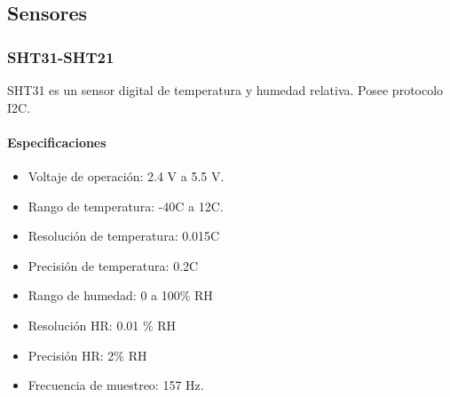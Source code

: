 
\subsection{Sensores}
	\subsubsection{SHT31-SHT21}
	SHT31 es un sensor digital de temperatura y humedad relativa. Posee protocolo I2C.
	\paragraph*{Especificaciones}

	\begin{minipage}[t]{.7\textwidth}
		\begin{itemize}
			\item   Voltaje de operación: 2.4 V a 5.5 V.
			\item	Rango de temperatura: -40\grad C a 12\grad C.
			\item   Resolución de temperatura: 0.015\grad C
			\item	Precisión de temperatura: 0.2\grad C 
			\item	Rango de humedad: 0 a 100\% RH
			\item   Resolución HR: 0.01 \% RH
			\item   Precisión HR: 2\% RH
			\item Frecuencia de muestreo: 157 Hz.
		\end{itemize}
	\end{minipage}	
	\begin{minipage}[t]{.3\textwidth}
		\centering{}
		\label{fig:SHT31}
	\end{minipage}

